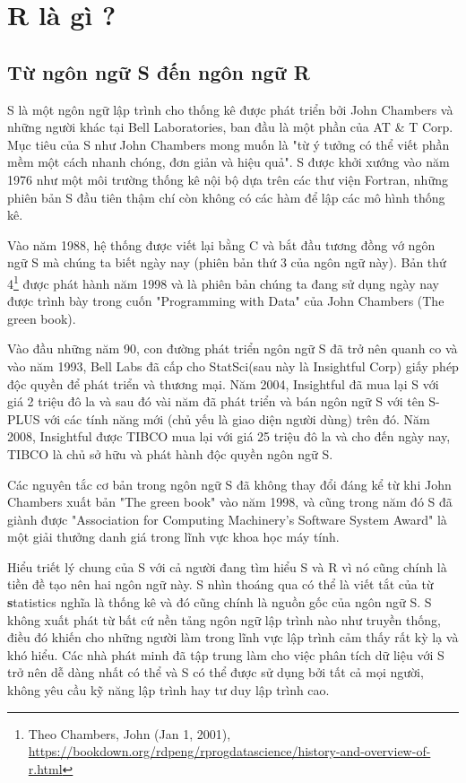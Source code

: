 \documentclass{standalone} %
\begin{document}
    \section{R là gì ?}
        \subsection{Từ ngôn ngữ S đến ngôn ngữ R}
        
        S là một ngôn ngữ lập trình cho thống kê được phát triển bởi John Chambers và những người khác tại Bell Laboratories, ban đầu là một phần của AT \& T Corp. Mục tiêu của S như John Chambers mong muốn là "từ ý tưởng có thể viết phần mềm một cách nhanh chóng, đơn giản và hiệu quả". S được khởi xướng vào năm 1976 như một môi trường thống kê nội bộ dựa trên các thư viện Fortran, những phiên bản S đầu tiên thậm chí còn không có các hàm để lập các mô hình thống kê.
        
        Vào năm 1988, hệ thống được viết lại bằng C và bắt đầu tương đồng vớ ngôn ngữ S mà chúng ta biết ngày nay (phiên bản thứ 3 của ngôn ngữ này). Bản thứ 4\footnote{Theo Chambers, John (Jan 1, 2001), \hyperref[Archive.org]{https://bookdown.org/rdpeng/rprogdatascience/history-and-overview-of-r.html}} được phát hành năm 1998 và là phiên bản chúng ta đang sử dụng ngày nay được trình bày trong cuốn "Programming with Data" của John Chambers (The green book).
        
        Vào đầu những năm 90, con đường phát triển ngôn ngữ S đã trở nên quanh co và vào năm 1993, Bell Labs đã cấp cho StatSci(sau này là Insightful Corp) giấy phép độc quyền để phát triển và thương mại. Năm 2004, Insightful đã mua lại S với giá 2 triệu đô la và sau đó vài năm đã phát triển và bán ngôn ngữ S với tên S-PLUS với các tính năng mới (chủ yếu là giao diện người dùng) trên đó. Năm 2008, Insightful được TIBCO mua lại với giá 25 triệu đô la và cho đến ngày nay, TIBCO là chủ sở hữu và phát hành độc quyền ngôn ngữ S.
        
        Các nguyên tắc cơ bản trong ngôn ngữ S đã không thay đổi đáng kể từ khi John Chambers xuất bản "The green book" vào năm 1998, và cũng trong năm đó S đã giành được "Association for Computing Machinery’s Software System Award" là một giải thưởng danh giá trong lĩnh vực khoa học máy tính.
        
        Hiểu triết lý chung của S với cả người đang tìm hiểu S và R vì nó cũng chính là tiền đề tạo nên hai ngôn ngữ này. S nhìn thoáng qua có thể là viết tắt của từ \textbf{s}tatistics nghĩa là thống kê và đó cũng chính là nguồn gốc của ngôn ngữ S. S không xuất phát từ bất cứ nền tảng ngôn ngữ lập trình nào như truyền thống, điều đó khiến cho những người làm trong lĩnh vực lập trình cảm thấy rất kỳ lạ và khó hiểu. Các nhà phát minh đã tập trung làm cho việc phân tích dữ liệu với S trở nên dễ dàng nhất có thể và S có thể được sử dụng bởi tất cả mọi người, không yêu cầu kỹ năng lập trình hay tư duy lập trình cao.
        
\end{document}
